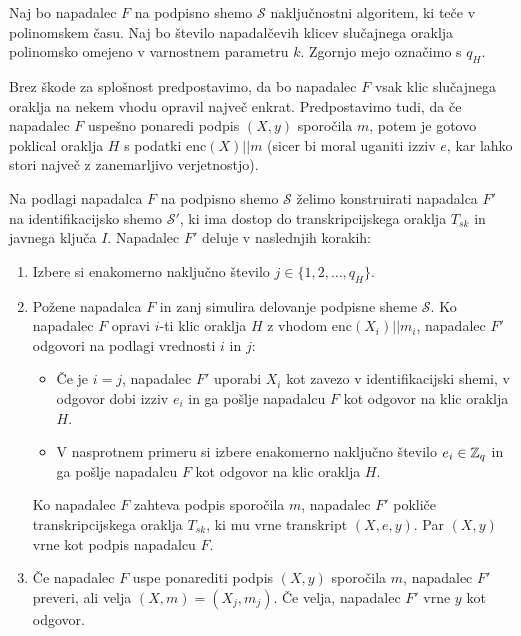 \begin{dokaz}
    Naj bo napadalec $F$ na podpisno shemo $\mathcal{S}$ naključnostni algoritem, ki teče v
    polinomskem času. Naj bo število napadalčevih klicev slučajnega oraklja polinomsko omejeno
    v varnostnem parametru $k$. Zgornjo mejo označimo s $q_H$.

    Brez škode za splošnost predpostavimo, da bo napadalec $F$ vsak klic slučajnega oraklja na
    nekem vhodu opravil največ enkrat. Predpostavimo tudi, da če napadalec $F$ uspešno ponaredi
    podpis $(X, y)$ sporočila $m$, potem je gotovo poklical oraklja $H$ s podatki $\text{enc}(X) || m$
    (sicer bi moral uganiti izziv $e$, kar lahko stori največ z zanemarljivo verjetnostjo).

    Na podlagi napadalca $F$ na podpisno shemo $\mathcal{S}$ želimo konstruirati napadalca $F'$
    na identifikacijsko shemo $\mathcal{S'}$, ki ima dostop do transkripcijskega oraklja $T_{sk}$
    in javnega ključa $I$. Napadalec $F'$ deluje v naslednjih korakih:
    \begin{enumerate}
        \item Izbere si enakomerno naključno število $j \in \{1, 2, \dots, q_H\}$.
        \item Požene napadalca $F$ in zanj simulira delovanje podpisne sheme $\mathcal{S}$.
            Ko napadalec $F$ opravi $i$-ti klic oraklja $H$ z vhodom $\text{enc}(X_i) || m_i$,
            napadalec $F'$ odgovori na podlagi vrednosti $i$ in $j$:
            \begin{itemize}
                \item Če je $i = j$, napadalec $F'$ uporabi $X_i$ kot zavezo v identifikacijski
                    shemi, v odgovor dobi izziv $e_i$ in ga pošlje napadalcu $F$ kot odgovor na
                    klic oraklja $H$.
                \item V nasprotnem primeru si izbere enakomerno naključno število $e_i \in \mathbb Z_q$ in ga
                    pošlje napadalcu $F$ kot odgovor na klic oraklja $H$.
            \end{itemize}
            Ko napadalec $F$ zahteva podpis sporočila $m$, napadalec $F'$ pokliče transkripcijskega
            oraklja $T_{sk}$, ki mu vrne transkript $(X, e, y)$. Par $(X, y)$ vrne kot podpis
            napadalcu $F$.
        \label{step:simulate}
        \item Če napadalec $F$ uspe ponarediti podpis $(X, y)$ sporočila $m$, napadalec $F'$ preveri,
            ali velja $(X, m) = (X_j, m_j)$. Če velja, napadalec $F'$ vrne $y$ kot odgovor.

\end{enumerate}
\end{dokaz}
